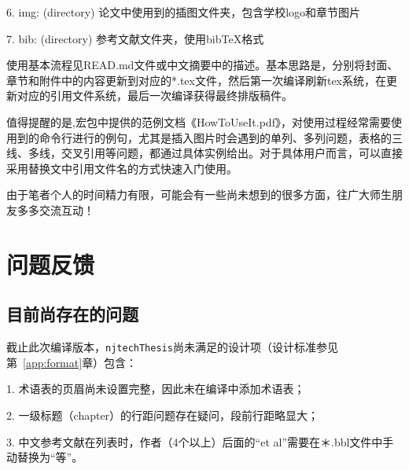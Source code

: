 6. img: (directory) 论文中使用到的插图文件夹，包含学校logo和章节图片

7. bib: (directory) 参考文献文件夹，使用bibTeX格式

使用基本流程见READ.md文件或中文摘要中的描述。基本思路是，分别将封面、章节和附件中的内容更新到对应的*.tex文件，然后第一次编译刷新tex系统，在更新对应的引用文件系统，最后一次编译获得最终排版稿件。

值得提醒的是,宏包中提供的范例文档《HowToUseIt.pdf》，对使用过程经常需要使用到的命令行进行的例句，尤其是插入图片时会遇到的单列、多列问题，表格的三线、多线，交叉引用等问题，都通过具体实例给出。对于具体用户而言，可以直接采用替换文中引用文件名的方式快速入门使用。

由于笔者个人的时间精力有限，可能会有一些尚未想到的很多方面，往广大师生朋友多多交流互动！

\section{问题反馈}
\label{sec:FandQ}

\subsection{目前尚存在的问题}
\label{sec:remainingProblem}
截止此次编译版本，\texttt{njtechThesis}尚未满足的设计项（设计标准参见第~\ref{app:format}章）包含：

1. 术语表的页眉尚未设置完整，因此未在编译中添加术语表；

2. 一级标题（chapter）的行距问题存在疑问，段前行距略显大；

3. 中文参考文献在列表时，作者（4个以上）后面的“et al”需要在＊.bbl文件中手动替换为“等”。


